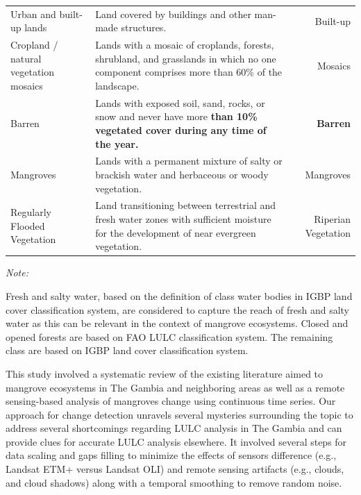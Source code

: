 \documentclass[utf8]{frontiersSCNS}
\begin{document}
\begin{table}[H]
{\begin{threeparttable}
\begin{tabular}[t]{llr}
\addlinespace
Urban and built-up lands & Land covered by buildings and other man-made structures. & Built-up\\
\addlinespace
Cropland / natural vegetation mosaics & Lands with a mosaic of croplands, forests, shrubland, and grasslands in
which no one component comprises more than 60\% of the landscape. & Mosaics\\
\addlinespace
Barren & Lands with exposed soil, sand, rocks, or snow and never have more
\textbf{than 10\% vegetated cover during any time of the year.} & \textbf{Barren}\\
\addlinespace
Mangroves & Lands with a permanent mixture of salty or brackish water and herbaceous or woody vegetation. & Mangroves\\
\addlinespace
Regularly Flooded Vegetation & Land transitioning between terrestrial and fresh water zones with sufficient moisture for the development of near evergreen vegetation. & Riperian Vegetation\\
\bottomrule
\end{tabular}
\begin{tablenotes}
\item \textit{Note: } 
\item Fresh and salty water, based on the definition of class water bodies in IGBP land cover classification system, are considered to capture the reach of fresh and salty water as this can be relevant in the context of mangrove ecosystems. Closed and opened forests are based on FAO LULC classification system. The remaining class are based on IGBP land cover classification system.
\end{tablenotes}
\end{threeparttable}}
\end{table}
\vspace{-2em}

\renewcommand{\arraystretch}{0.25}

This study involved a systematic review of the existing literature aimed
to mangrove ecosystems in The Gambia and neighboring areas as well as a
remote sensing-based analysis of mangroves change using continuous time
series. Our approach for change detection unravels several mysteries
surrounding the topic to address several shortcomings regarding LULC
analysis in The Gambia and can provide clues for accurate LULC analysis
elsewhere. It involved several steps for data scaling and gaps filling
to minimize the effects of sensors difference (e.g., Landsat ETM+ versus
Landsat OLI) and remote sensing artifacts (e.g., clouds, and cloud
shadows) along with a temporal smoothing to remove random noise.
\end{document}
